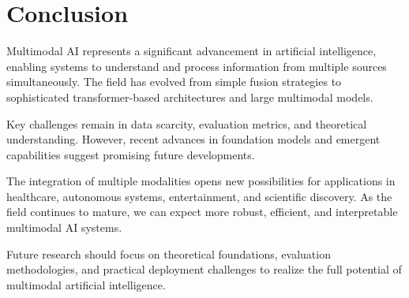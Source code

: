 \documentclass[11pt,a4paper]{article}
\begin{document}
\section{Conclusion}

Multimodal AI represents a significant advancement in artificial intelligence, enabling systems to understand and process information from multiple sources simultaneously. The field has evolved from simple fusion strategies to sophisticated transformer-based architectures and large multimodal models.

Key challenges remain in data scarcity, evaluation metrics, and theoretical understanding. However, recent advances in foundation models and emergent capabilities suggest promising future developments.

The integration of multiple modalities opens new possibilities for applications in healthcare, autonomous systems, entertainment, and scientific discovery. As the field continues to mature, we can expect more robust, efficient, and interpretable multimodal AI systems.

Future research should focus on theoretical foundations, evaluation methodologies, and practical deployment challenges to realize the full potential of multimodal artificial intelligence.
\end{document}
